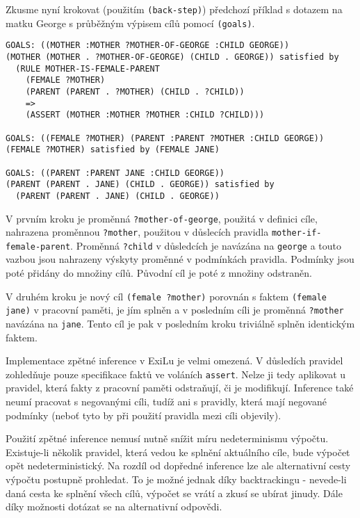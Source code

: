 Zkusme nyní krokovat (použitím \verb|(back-step)|) předchozí příklad s dotazem na
matku George s průběžným výpisem cílů pomocí \verb|(goals)|.
\begin{verbatim}
GOALS: ((MOTHER :MOTHER ?MOTHER-OF-GEORGE :CHILD GEORGE))
(MOTHER (MOTHER . ?MOTHER-OF-GEORGE) (CHILD . GEORGE)) satisfied by
  (RULE MOTHER-IS-FEMALE-PARENT
    (FEMALE ?MOTHER)
    (PARENT (PARENT . ?MOTHER) (CHILD . ?CHILD))
    =>
    (ASSERT (MOTHER :MOTHER ?MOTHER :CHILD ?CHILD)))

GOALS: ((FEMALE ?MOTHER) (PARENT :PARENT ?MOTHER :CHILD GEORGE))
(FEMALE ?MOTHER) satisfied by (FEMALE JANE)

GOALS: ((PARENT :PARENT JANE :CHILD GEORGE))
(PARENT (PARENT . JANE) (CHILD . GEORGE)) satisfied by
  (PARENT (PARENT . JANE) (CHILD . GEORGE))
\end{verbatim}
V prvním kroku je proměnná \verb|?mother-of-george|, použitá v definici cíle,
nahrazena proměnnou \verb|?mother|, použitou v důslecích pravidla
\verb|mother-if-female-parent|. Proměnná \verb|?child| v důsledcích je navázána
na \verb|george| a touto vazbou jsou nahrazeny výskyty proměnné v podmínkách
pravidla. Podmínky jsou poté přidány do množiny cílů. Původní cíl je poté z
množiny odstraněn.

V druhém kroku je nový cíl \verb|(female ?mother)| porovnán s faktem
\verb|(female jane)| v pracovní paměti, je jím splněn a v posledním cíli je
proměnná \verb|?mother| navázána na \verb|jane|. Tento cíl je pak
v posledním kroku triviálně splněn identickým faktem.

Implementace zpětné inference v ExiLu je velmi omezená. V důsledích pravidel
zohledňuje pouze specifikace faktů ve voláních \verb|assert|. Nelze ji tedy
aplikovat u pravidel, která fakty z pracovní paměti odstraňují, či je
modifikují. Inference také neumí pracovat s negovanými cíli, tudíž ani s
pravidly, která mají negované podmínky (neboť tyto by při použití pravidla
mezi cíli objevily).

Použití zpětné inference nemusí nutně snížit míru nedeterminismu výpočtu.
Existuje-li několik pravidel, která vedou ke splnění aktuálního cíle, bude
výpočet opět nedeterministický. Na rozdíl od dopředné inference lze ale
alternativní cesty výpočtu postupně prohledat. To je možné jednak díky
backtrackingu - nevede-li daná cesta ke splnění všech cílů, výpočet se vrátí a
zkusí se ubírat jinudy. Dále díky možnosti dotázat se na alternativní odpovědi.
